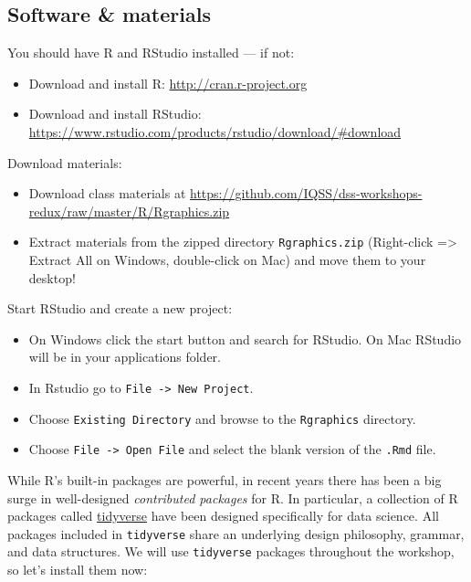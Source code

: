 \documentclass[]{book}
\providecommand{\tightlist}{%
  \setlength{\itemsep}{0pt}\setlength{\parskip}{0pt}}
\begin{document}
\subsection{Software \& materials}\label{software-materials-2}

You should have R and RStudio installed --- if not:

\begin{itemize}
\tightlist
\item
  Download and install R: \url{http://cran.r-project.org}
\item
  Download and install RStudio:
  \url{https://www.rstudio.com/products/rstudio/download/\#download}
\end{itemize}

Download materials:

\begin{itemize}
\tightlist
\item
  Download class materials at
  \url{https://github.com/IQSS/dss-workshops-redux/raw/master/R/Rgraphics.zip}
\item
  Extract materials from the zipped directory \texttt{Rgraphics.zip}
  (Right-click =\textgreater{} Extract All on Windows, double-click on
  Mac) and move them to your desktop!
\end{itemize}

Start RStudio and create a new project:

\begin{itemize}
\tightlist
\item
  On Windows click the start button and search for RStudio. On Mac
  RStudio will be in your applications folder.
\item
  In Rstudio go to \texttt{File\ -\textgreater{}\ New\ Project}.
\item
  Choose \texttt{Existing\ Directory} and browse to the
  \texttt{Rgraphics} directory.
\item
  Choose \texttt{File\ -\textgreater{}\ Open\ File} and select the blank
  version of the \texttt{.Rmd} file.
\end{itemize}

While R's built-in packages are powerful, in recent years there has been
a big surge in well-designed \emph{contributed packages} for R. In
particular, a collection of R packages called
\href{https://www.tidyverse.org/}{tidyverse} have been designed
specifically for data science. All packages included in
\texttt{tidyverse} share an underlying design philosophy, grammar, and
data structures. We will use \texttt{tidyverse} packages throughout the
workshop, so let's install them now:
\end{document}
